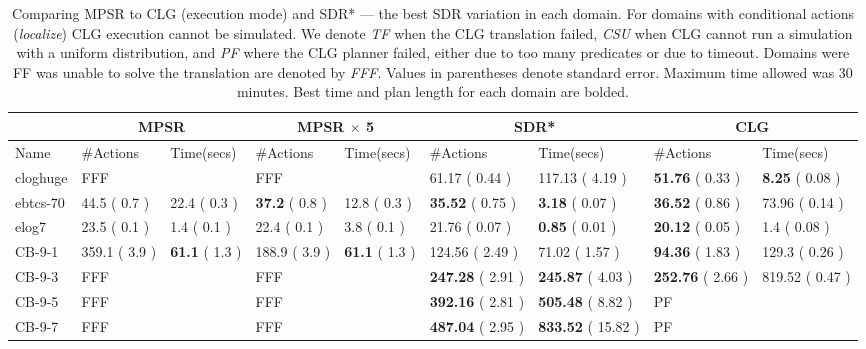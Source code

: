 \documentclass[letterpaper]{article}
\numberwithin{equation}{section}	%
\begin{document}
\begin{table}[htb]
\centering
\caption{
\footnotesize
Comparing MPSR to CLG (execution mode) and SDR* --- the best SDR variation in each domain. For domains with conditional actions (\emph{localize}) CLG execution cannot be simulated. We denote {\em TF} when the CLG translation failed, {\em CSU} when CLG  cannot run a simulation with a uniform distribution, and {\em PF} where the CLG planner failed, either due to too many predicates or due to timeout. Domains were FF was unable to solve the translation are denoted by {\em FFF}. Values in parentheses denote standard error. Maximum time allowed was 30 minutes. Best time and plan length for each domain are bolded.
}
\scriptsize
\begin{tabular}{|l||l|l||l|l||l|l||l|l|}
\hline
	&\multicolumn{2}{c||}{MPSR}&\multicolumn{2}{c||}{MPSR $\times$ 5}&\multicolumn{2}{c|}{SDR*}&\multicolumn{2}{c|}{CLG}\\\hline
Name	&	\#Actions			&	Time(secs)			&	\#Actions			&	Time(secs)			&	\#Actions			&	Time(secs)			 &	\#Actions		 &		Time(secs)		\\ \hline
cloghuge	&		FFF&		&		FFF		&		&		61.17	(	0.44	)&	117.13	(	4.19	)&		\textbf{51.76}	(	0.33	)&	\textbf{8.25}	(	 0.08	 )\\
ebtcs-70	&	44.5	(	0.7	)&	22.4	(	0.3	)&			\textbf{37.2}	(	0.8	)&	12.8	(	0.3	)&		\textbf{35.52}	(	0.75	)&	\textbf{3.18}	(	 0.07	)&		\textbf{36.52}	 (	0.86	)&	73.96	(	0.14	 )\\
elog7	&	23.5	(	0.1	)&	1.4	(	0.1	)&			22.4	(	0.1	)&	3.8	(	0.1	)&		21.76	(	0.07	)&	\textbf{0.85}	(	0.01	)&		\textbf{20.12}	 (	0.05	)&	1.4	(	0.08	 )\\
\hline

CB-9-1	&	359.1	(	3.9	)&	\textbf{61.1}	(	1.3	)&			188.9	(	3.9	)&	\textbf{61.1}	(	1.3	)&		124.56	(	2.49	)&	71.02	(	1.57	)&		 \textbf{94.36}	(	1.83	 )&	129.3	(	0.26	 )\\
CB-9-3	&		FFF&		&				FFF&		&		\textbf{247.28}	(	2.91	)&	\textbf{245.87}	(	4.03	)&		\textbf{252.76}	(	2.66	)&	819.52	 (	0.47	)\\
CB-9-5	&		FFF&		&				FFF&		&		\textbf{392.16}	(	2.81	)&	\textbf{505.48}	(	8.82	)&		PF			&				\\
CB-9-7	&		FFF&		&				FFF&		&		\textbf{487.04}	(	2.95	)&	\textbf{833.52}	(	15.82	)&		PF			&				\\
\hline


\end{tabular}
\end{table}
\end{document}
